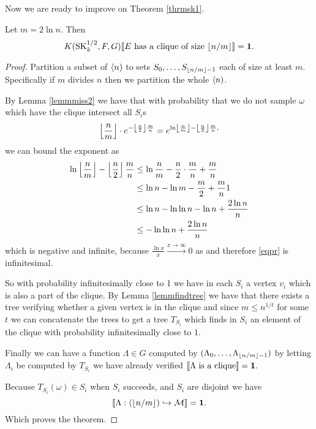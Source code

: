 Now we are ready to improve on Theorem \ref{thrmsk1}.

\begin{thrm}\label{thrmsk}
Let $m = 2 \ln n$. Then
\[K(\text{SK}_k^{1/2},F,G)[\![\text{$E$ has a clique of size $\left \lfloor {n/m} \right \rfloor$}]\!]=\textbf{1}.\]
\end{thrm}
\begin{proof}
Partition a subset of $\langle n)$ to sets $S_{0},\dots,S_{\left \lfloor {n/m} \right \rfloor-1}$ each of size at least $m$. Specifically if $m$ divides $n$ then we partition the whole $\langle n)$.

By Lemma \ref{lemmmiss2} we have that with probability that we do not sample $\omega$ which have the clique intersect all $S_i$s 
\begin{align}
\left \lfloor {\frac{n}{m}} \right \rfloor\cdot e^{-\left \lfloor {\frac{n}{2}} \right \rfloor\frac{m}{n}} = e^{\ln\left \lfloor {\frac{n}{m}} \right \rfloor-\left \lfloor {\frac{n}{2}} \right \rfloor\frac{m}{n},}\label{eqpr}
\end{align}
we can bound the exponent as
\begin{align}
\ln\left \lfloor {\frac{n}{m}} \right \rfloor-\left \lfloor {\frac{n}{2}} \right \rfloor\frac{m}{n}&\leq\ln\frac{n}{m}-\frac{n}{2}\cdot\frac{m}{n}+\frac{m}{n}\\
&\leq\ln n - \ln m - \frac{m}{2} + \frac{m}{n}1\\
&\leq \ln n - \ln \ln n - \ln n+\frac{2\ln n}{n}\\
&\leq - \ln \ln n + \frac{2\ln n}{n}
\end{align}
which is negative and infinite, because $\frac{\ln x}{x}\overset{x\to \infty}{\to} 0$ as  and therefore \eqref{eqpr} is infinitesimal.

So with probability infinitesimally close to 1 we have in each $S_i$ a vertex $v_i$ which is also a part of the clique. By Lemma \ref{lemmfindtree} we have that there exists a tree verifying whether a given vertex is in the clique and since $m\leq n^{1/t}$ for some $t$ we can concatenate the trees to get a tree $T_{S_i}$ which finds in $S_i$ an element of the clique with probability infinitesimally close to $1$.

Finally we can have a function $\Lambda\in G$ computed by $(\Lambda_0,\dots,\Lambda_{\left \lfloor {n/m} \right \rfloor-1})$ by letting $\Lambda_i$ be computed by $T_{S_i}$ we have already verified $[\![\Lambda\text{ is a clique}]\!]=\textbf{1}.$

Because $T_{S_i}(\omega)\in S_i$ when $S_i$ succeeds, and $S_i$ are disjoint we have \[[\![\Lambda:\langle \left \lfloor {n/m} \right \rfloor)\hookrightarrow \mathcal{M}]\!]=\textbf{1}. \]
Which proves the theorem.
\end{proof}

